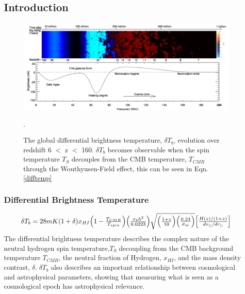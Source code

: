 \documentclass[a0,landscape]{a0poster}
\begin{document}
\begin{multicols}{4}
\begin{abstract}
\end{abstract}


\color{SaddleBrown} %

\section*{Introduction}


\begin{figure}[H]
\centering
\includegraphics[width=1.0\linewidth]{figures/global_history.png}
\caption{The global differential brightness temperature, $\delta T_b$, evolution over redshift 6 $<$ z $<$ 160. $\delta T_b$ becomes observable when 
the spin temperature $T_S$ decouples from the CMB temperature, $T_{CMB}$ through the Wouthyusen-Field effect, this can be seen in 
Eqn. \ref{difftemp}}.
\end{figure}


\subsubsection*{Differential Brightness Temperature}
\begin{equation}
\label{difftemp}
\resizebox{.9\hsize}{!}{$
\delta T_{b} = 28mK(1+\delta)x_{HI}\Big(1-\frac{T_{CMB}}{T_{spin}}\Big)\Big(\frac{\sigma_{b}h^2}{0.0223}\Big)\sqrt{\Big(\frac{1+z}{10}\Big)\Big(\frac{0.24}{\sigma_m}\Big)}\Big[ \frac{H(z)/(1+z)}{dv_{||}/dr_{||}}\Big]$}
\end{equation}
The differential brightness temperature describes the complex nature of the neutral hydrogen spin temperature,$T_S$ decoupling from the CMB background temperature $T_{CMB}$, the neutral fraction of Hydrogen, $x_{HI}$, and the mass density contrast, $\delta$.
$\delta T_b$ also describes an important relationship between cosmological and astrophysical parameters, showing that measuring what is seen as a cosmological epoch has astrophysical relevance.



\end{multicols}
\end{document}
